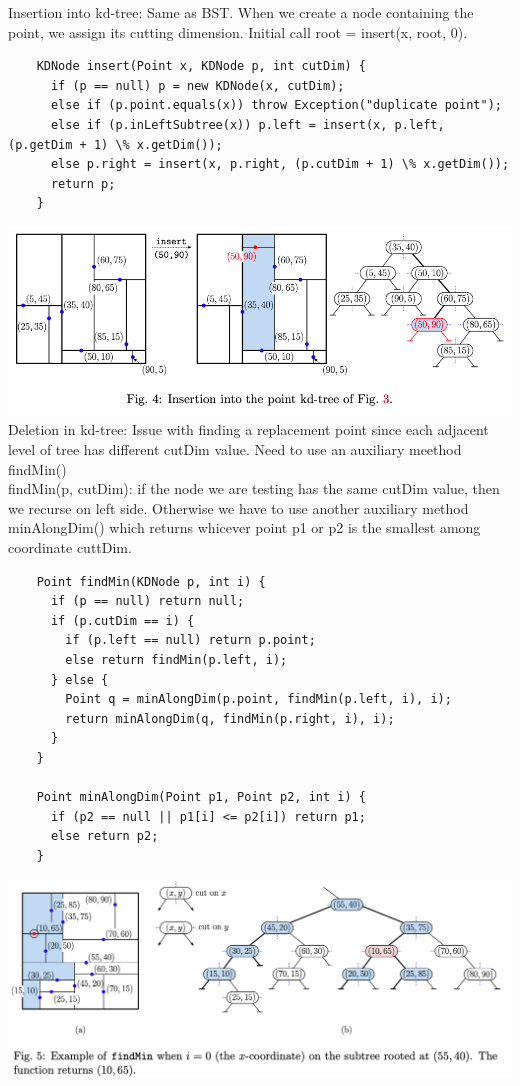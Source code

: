 \documentclass{article}
\begin{document}
  Insertion into kd-tree: Same as BST. When we create a node containing the point, we assign its cutting dimension. Initial call root = insert(x, root, 0).
  \begin{lstlisting}
    KDNode insert(Point x, KDNode p, int cutDim) {
      if (p == null) p = new KDNode(x, cutDim);
      else if (p.point.equals(x)) throw Exception("duplicate point");
      else if (p.inLeftSubtree(x)) p.left = insert(x, p.left, (p.getDim + 1) \% x.getDim());
      else p.right = insert(x, p.right, (p.cutDim + 1) \% x.getDim());
      return p;
    }
  \end{lstlisting}
  \includegraphics[width=\textwidth]{KDInsertion}
  \newpage
  Deletion in kd-tree: Issue with finding a replacement point since each adjacent level of tree has different cutDim value. Need to use an auxiliary meethod findMin()\\
  findMin(p, cutDim): if the node we are testing has the same cutDim value, then we recurse on left side. Otherwise we have to use another auxiliary method minAlongDim() which returns whicever point p1 or p2 is the smallest among coordinate cuttDim.
  \begin{lstlisting}
    Point findMin(KDNode p, int i) {
      if (p == null) return null;
      if (p.cutDim == i) {
        if (p.left == null) return p.point;
        else return findMin(p.left, i);
      } else {
        Point q = minAlongDim(p.point, findMin(p.left, i), i);
        return minAlongDim(q, findMin(p.right, i), i);
      }
    }

    Point minAlongDim(Point p1, Point p2, int i) {
      if (p2 == null || p1[i] <= p2[i]) return p1;
      else return p2;
    }
  \end{lstlisting}
  \includegraphics[width=\textwidth]{KDTreeFindMin}
\end{document}
